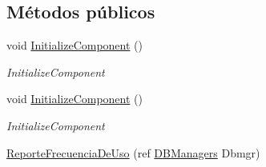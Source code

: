 \subsection*{Métodos públicos}
\begin{DoxyCompactItemize}
\item 
void \hyperlink{class_proyecto___integrador__3_1_1_reportes_1_1_reporte_frecuencia_de_uso_ab0c2c9d5584ade92aa8142d2299bfe06}{Initialize\-Component} ()
\begin{DoxyCompactList}\small\item\em Initialize\-Component \end{DoxyCompactList}\item 
void \hyperlink{class_proyecto___integrador__3_1_1_reportes_1_1_reporte_frecuencia_de_uso_ab0c2c9d5584ade92aa8142d2299bfe06}{Initialize\-Component} ()
\begin{DoxyCompactList}\small\item\em Initialize\-Component \end{DoxyCompactList}\item 
\hyperlink{class_proyecto___integrador__3_1_1_reportes_1_1_reporte_frecuencia_de_uso_a6150054e9ff15f176a07d74d892c19a5}{Reporte\-Frecuencia\-De\-Uso} (ref \hyperlink{class_proyecto___integrador__3_1_1_d_b_managers}{D\-B\-Managers} Dbmgr)
\end{DoxyCompactItemize}
